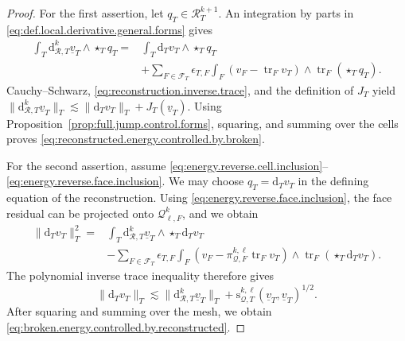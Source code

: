 \documentclass[a4paper,11pt]{article}
\theoremstyle{definition}
\newcommand{\DIFF}{\mathrm{d}}
\newcommand{\Qtrace}[2]{\mathcal Q_{\ell,#1}^{#2}}
\newcommand{\piQ}[2]{\pi_{\mathcal Q,#1}^{#2,\ell}}
\newcommand{\trc}{\operatorname{tr}}
\newcommand{\epsTF}{\epsilon_{T,F}}
\begin{document}
\begin{proof}
For the first assertion, let $q_T\in\mathcal R_T^{k+1}$.
An integration by parts in \eqref{eq:def.local.derivative.general.forms} gives
\[
\begin{aligned}
  \int_T
  \DIFF_{\mathcal R,T}^{k}\underline v_T
  \wedge\star_Tq_T
  ={}&
  \int_T
  \DIFF_Tv_T\wedge\star_Tq_T
  \\
  &+
  \sum_{F\in\mathcal F_T}
  \epsTF
  \int_F
  (v_F-\trc_Fv_T)
  \wedge
  \trc_F(\star_Tq_T).
\end{aligned}
\]
Cauchy--Schwarz, \eqref{eq:reconstruction.inverse.trace}, and the definition of $J_T$ yield $\|\DIFF_{\mathcal R,T}^{k}\underline v_T\|_T \lesssim \|\DIFF_Tv_T\|_T + J_T(\underline v_T)$.
Using Proposition~\ref{prop:full.jump.control.forms}, squaring, and summing over the cells proves \eqref{eq:reconstructed.energy.controlled.by.broken}.

For the second assertion, assume \eqref{eq:energy.reverse.cell.inclusion}-- \eqref{eq:energy.reverse.face.inclusion}.
We may choose $q_T=\DIFF_Tv_T$ in the defining equation of the reconstruction.
Using \eqref{eq:energy.reverse.face.inclusion}, the face residual can be projected onto $\Qtrace{F}{k}$, and we obtain
\[
\begin{aligned}
  \|\DIFF_Tv_T\|_T^2
  ={}&
  \int_T
  \DIFF_{\mathcal R,T}^{k}\underline v_T
  \wedge
  \star_T\DIFF_Tv_T
  \\
  &-
  \sum_{F\in\mathcal F_T}
  \epsTF
  \int_F
  \left(
    v_F-\piQ{F}{k}\trc_Fv_T
  \right)
  \wedge
  \trc_F
  \left(
    \star_T\DIFF_Tv_T
  \right).
\end{aligned}
\]
The polynomial inverse trace inequality therefore gives
\[
  \|\DIFF_Tv_T\|_T
  \lesssim
  \|\DIFF_{\mathcal R,T}^{k}\underline v_T\|_T
  +
  \mathrm s_{\mathcal Q,T}^{k,\ell}
  (\underline v_T,\underline v_T)^{1/2}.
\]
After squaring and summing over the mesh, we obtain \eqref{eq:broken.energy.controlled.by.reconstructed}.
\end{proof}
\end{document}
